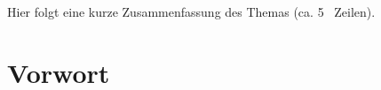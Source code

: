 \renewcommand{\abstractname}{Abstract}
\abstract Hier folgt eine kurze Zusammenfassung des Themas (ca. 5~
Zeilen).



\chapter*{Vorwort}





